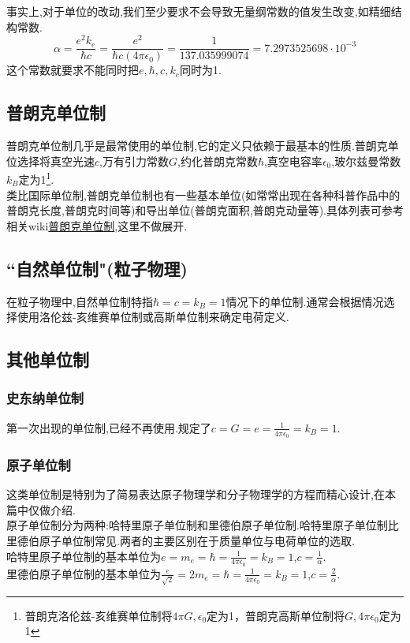 事实上,对于单位的改动,我们至少要求不会导致无量纲常数的值发生改变,如精细结构常数.
$${\displaystyle \alpha ={\frac {e^{2}k_{e}}{\hbar c}}={\frac {e^{2}}{\hbar c(4\pi \epsilon _{0})}}={\frac {1}{137.035999074}}=7.2973525698\cdot 10^{-3}}$$
这个常数就要求不能同时把${\displaystyle e},{\displaystyle \hbar },{\displaystyle c},{\displaystyle k_{e}}$同时为1.
\subsection{普朗克单位制}
普朗克单位制几乎是最常使用的单位制,它的定义只依赖于最基本的性质.普朗克单位选择将真空光速${\displaystyle c}$,万有引力常数${\displaystyle G}$,约化普朗克常数${\displaystyle \hbar }$,真空电容率${\displaystyle \epsilon _{0}}$,玻尔兹曼常数${\displaystyle k_{B}}$定为1\footnote{普朗克洛伦兹-亥维赛单位制将${\displaystyle 4\pi G},{\displaystyle \epsilon _{0}}$定为1，普朗克高斯单位制将${\displaystyle G},{\displaystyle 4\pi \epsilon _{0}}$定为1}.\\
类比国际单位制,普朗克单位制也有一些基本单位(如常常出现在各种科普作品中的普朗克长度,普朗克时间等)和导出单位(普朗克面积,普朗克动量等).具体列表可参考相关wiki\href{https://zh.wikipedia.org/wiki/%E6%99%AE%E6%9C%97%E5%85%8B%E5%96%AE%E4%BD%8D%E5%88%B6}{普朗克单位制},这里不做展开.
\subsection{``自然单位制"(粒子物理)}
在粒子物理中,自然单位制特指${\displaystyle \hbar =c=k_{B}=1}$情况下的单位制.通常会根据情况选择使用洛伦兹-亥维赛单位制或高斯单位制来确定电荷定义.
\subsection{其他单位制}
\subsubsection*{史东纳单位制}
第一次出现的单位制,已经不再使用.规定了${\displaystyle c=G=e={\frac {1}{4\pi \epsilon _{0}}}=k_{B}=1}$.
\subsubsection*{原子单位制}
这类单位制是特别为了简易表达原子物理学和分子物理学的方程而精心设计,在本篇中仅做介绍.\\
原子单位制分为两种:哈特里原子单位制和里德伯原子单位制.哈特里原子单位制比里德伯原子单位制常见.两者的主要区别在于质量单位与电荷单位的选取.\\
哈特里原子单位制的基本单位为${\displaystyle e=m_{e}=\hbar ={\frac {1}{4\pi \epsilon _{0}}}=k_{B}=1}$,${\displaystyle c={\frac {1}{\alpha }}}$.\\
里德伯原子单位制的基本单位为${\displaystyle {\frac {e}{\sqrt {2}}}=2m_{e}=\hbar ={\frac {1}{4\pi \epsilon _{0}}}=k_{B}=1}$,${\displaystyle c={\frac {2}{\alpha }}}$.
